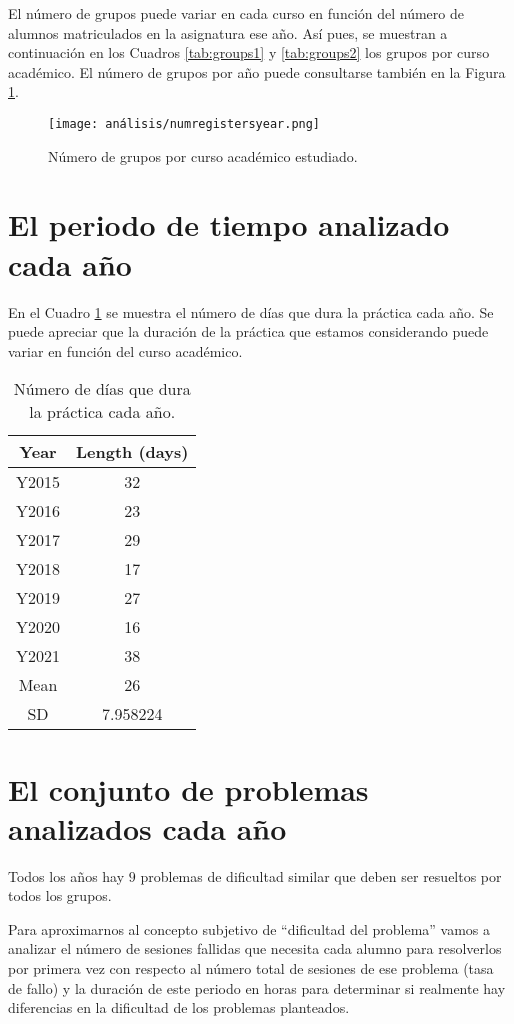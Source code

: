 El número de grupos puede variar en cada curso en función del número de alumnos matriculados en la asignatura ese año. Así pues, se muestran a continuación en los Cuadros \ref{tab:groups1} y \ref{tab:groups2} los grupos por curso académico. El número de grupos por año puede consultarse también en la Figura \ref{fig:groupsperyear}.

\begin{figure}[H]
    \centering
    \texttt{[image: análisis/numregistersyear.png]}
    \caption{Número de grupos por curso académico estudiado.}
    \label{fig:groupsperyear}
\end{figure}

\section{El periodo de tiempo analizado cada año}

En el Cuadro \ref{tab:days} se muestra el número de días que dura la práctica cada año. Se puede apreciar que la duración de la práctica que estamos considerando puede variar en función del curso académico.

\begin{table}[H]
\centering
\caption{Número de días que dura la práctica cada año.}
\label{tab:days}
\begin{tabular}{cc}
\hline
\textbf{Year}  & \textbf{Length (days)}  \\ \hline
Y2015 & 32 \\
Y2016 & 23 \\
Y2017 & 29 \\
Y2018 & 17 \\
Y2019 & 27 \\
Y2020 & 16 \\
Y2021 & 38 \\ \hline
Mean & 26 \\
SD & 7.958224 \\ \hline
\end{tabular}
\end{table}

\section{El conjunto de problemas analizados cada año}

Todos los años hay $9$ problemas de dificultad similar que deben ser resueltos por todos los grupos.

Para aproximarnos al concepto subjetivo de ``dificultad del problema'' vamos a analizar el número de sesiones fallidas que necesita cada alumno para resolverlos por primera vez con respecto al número total de sesiones de ese problema (tasa de fallo) y la duración de este periodo en horas para determinar si realmente hay diferencias en la dificultad de los problemas planteados.

